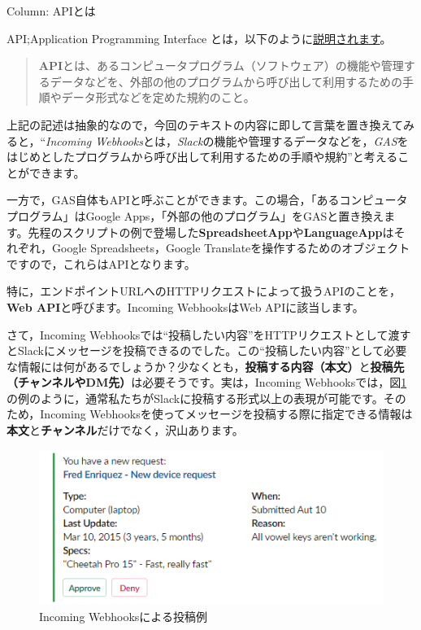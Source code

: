 \documentclass[uplatex,a4j]{jsarticle}
\begin{document}
\begin{itembox}[l]{Column: APIとは}

API;Application Programming Interface とは，以下のように\href{http://e-words.jp/w/API.html}{説明されます}。

\begin{quote}
\textbf{API}とは、あるコンピュータプログラム（ソフトウェア）の機能や管理するデータなどを、外部の他のプログラムから呼び出して利用するための手順やデータ形式などを定めた規約のこと。
\end{quote}

上記の記述は抽象的なので，今回のテキストの内容に即して言葉を置き換えてみると，``\textit{Incoming Webhooks}とは，\textit{Slack}の機能や管理するデータなどを，\textit{GAS}をはじめとしたプログラムから呼び出して利用するための手順や規約''と考えることができます。


一方で，GAS自体もAPIと呼ぶことができます。この場合，「あるコンピュータプログラム」はGoogle Apps，「外部の他のプログラム」をGASと置き換えます。先程のスクリプトの例で登場した\textbf{SpreadsheetApp}や\textbf{LanguageApp}はそれぞれ，Google Spreadsheets，Google Translateを操作するためのオブジェクトですので，これらはAPIとなります。

特に，エンドポイントURLへのHTTPリクエストによって扱うAPIのことを，\textbf{Web API}と呼びます。Incoming WebhooksはWeb APIに該当します。

\end{itembox}

さて，Incoming Webhooksでは``投稿したい内容''をHTTPリクエストとして渡すとSlackにメッセージを投稿できるのでした。この``投稿したい内容''として必要な情報には何があるでしょうか？少なくとも，\textbf{投稿する内容（本文）}と\textbf{投稿先（チャンネルやDM先）}は必要そうです。実は，Incoming Webhooksでは，図\ref{fig:webhook_sample}の例のように，通常私たちがSlackに投稿する形式以上の表現が可能です。そのため，Incoming Webhooksを使ってメッセージを投稿する際に指定できる情報は\textbf{本文}と\textbf{チャンネル}だけでなく，沢山あります。

\begin{figure}[h]
 \centering
 \includegraphics[keepaspectratio, scale=0.8]{images/webhook_sample.png}
 \caption{Incoming Webhooksによる投稿例}
 \label{fig:webhook_sample}
\end{figure}
\end{document}
